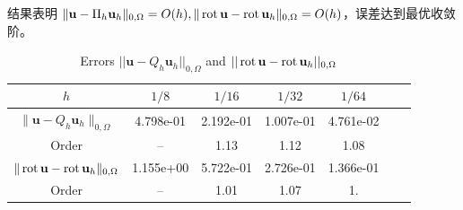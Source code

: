\documentclass[notheorems,serif]{beamer}
\begin{document}
\begin{frame}
结果表明
$\|\mathbf{u} - \Pi_h \mathbf{u}_h\|_{0,\Omega} = O(h), \|\operatorname{rot} \mathbf{u} -
\operatorname{rot}\mathbf{u}_h\|_{0,\Omega} = O(h)$，误差达到最优收敛阶。
\begin{table}[!htp] 
\centering
\caption{Errors $||\mathbf{u} - Q_h \mathbf{u}_h||_{0,\Omega}$ and $||\operatorname{rot}
\mathbf{u} - \operatorname{rot} \mathbf{u}_h||_{0,\Omega}$ }
\label{tab:exm0}
\begin{tabular}[c]{|c|c|c|c|c|c|c|}\hline
$h$ & $1/8$ & $1/16$ & $1/32$ & $1/64$ 
\\\hline
$\|\mathbf{u} - Q_h{\mathbf{u}}_h \|_{0,\Omega}$ & 4.798e-01 & 2.192e-01 & 1.007e-01 & 4.761e-02 
\\\hline
Order & -- & 1.13 & 1.12 & 1.08 
\\\hline
$ \| \operatorname{rot} \mathbf{u} - \operatorname{rot} \mathbf{u}_h\|_{0,\Omega}$ & 1.155e+00 & 5.722e-01 & 2.726e-01 & 1.366e-01 
\\\hline
Order & -- & 1.01 & 1.07 & 1. 
\\\hline
\end{tabular}
\end{table} 
\end{frame}
\end{document}
